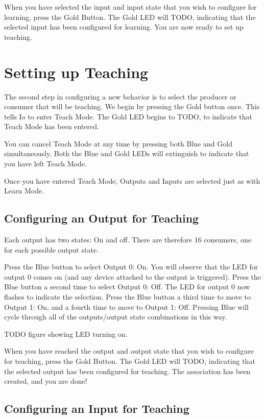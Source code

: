 \documentclass[12pt]{book}
\begin{document}
When you have selected the input and input state that you wish to configure for learning, press the Gold Button. The Gold LED will TODO, indicating that the selected input has been configured for learning. You are now ready to set up teaching.

\section{Setting up Teaching}

The second step in configuring a new behavior is to select the producer or consumer that will be teaching. We begin by pressing the Gold button once. This tells Io to enter Teach Mode. The Gold LED begins to TODO, to indicate that Teach Mode has been entered.

You can cancel Teach Mode at any time by pressing both Blue and Gold simultaneously. Both the Blue and Gold LEDs will extinguish to indicate that you have left Teach Mode.

Once you have entered Teach Mode, Outputs and Inputs are selected just as with Learn Mode.

\subsection{Configuring an Output for Teaching}

Each output has two states: On and off. There are therefore 16 consumers, one for each possible output state. 

Press the Blue button to select Output 0: On. You will observe that the LED for output 0 comes on (and any device attached to the output is triggered). Press the Blue button a second time to select Output 0: Off. The LED for output 0 now flashes to indicate the selection. Press the Blue button a third time to move to Output 1: On, and a fourth time to move to Output 1: Off. Pressing Blue will cycle through all of the outputs/output state combinations in this way.

TODO figure showing LED turning on.

When you have reached the output and output state that you wish to configure for teaching, press the Gold Button. The Gold LED will TODO, indicating that the selected output has been configured for teaching. The association has been created, and you are done!

\subsection{Configuring an Input for Teaching}
\end{document}
